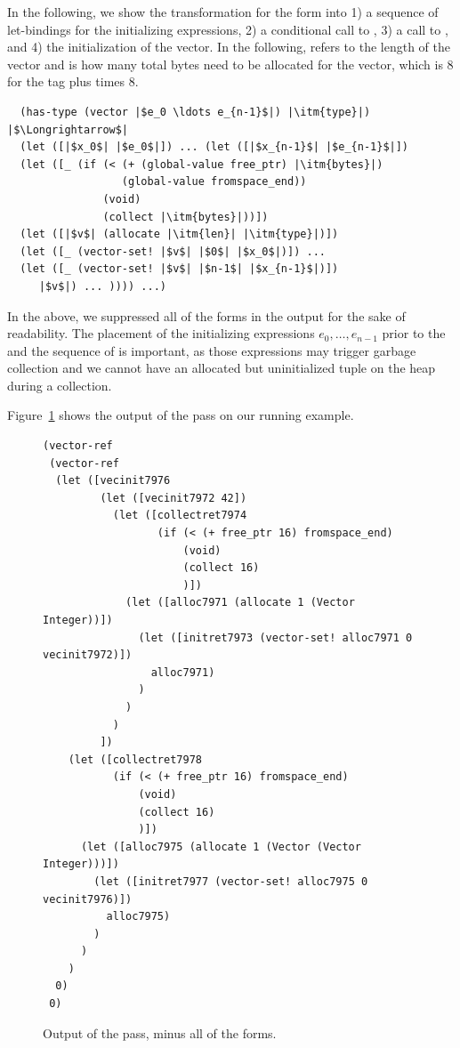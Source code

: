 \documentclass[11pt]{book}
\begin{document}
In the following, we show the transformation for the 
form into 1) a sequence of let-bindings for the initializing
expressions, 2) a conditional call to , 3) a call to
, and 4) the initialization of the vector. In the
following,  refers to the length of the vector and
 is how many total bytes need to be allocated for the
vector, which is 8 for the tag plus  times 8.
\begin{lstlisting}
  (has-type (vector |$e_0 \ldots e_{n-1}$|) |\itm{type}|)
|$\Longrightarrow$|
  (let ([|$x_0$| |$e_0$|]) ... (let ([|$x_{n-1}$| |$e_{n-1}$|])
  (let ([_ (if (< (+ (global-value free_ptr) |\itm{bytes}|)
                  (global-value fromspace_end))
               (void)
               (collect |\itm{bytes}|))])
  (let ([|$v$| (allocate |\itm{len}| |\itm{type}|)])
  (let ([_ (vector-set! |$v$| |$0$| |$x_0$|)]) ...
  (let ([_ (vector-set! |$v$| |$n-1$| |$x_{n-1}$|)])
     |$v$|) ... )))) ...)
\end{lstlisting}
In the above, we suppressed all of the  forms in the
output for the sake of readability.  The placement of the initializing
expressions $e_0,\ldots,e_{n-1}$ prior to the  and the
sequence of  is important, as those expressions may
trigger garbage collection and we cannot have an allocated but
uninitialized tuple on the heap during a collection.

Figure~\ref{fig:expose-alloc-output} shows the output of the
 pass on our running example.

\begin{figure}[tbp]
\begin{lstlisting}
(vector-ref
 (vector-ref
  (let ([vecinit7976
         (let ([vecinit7972 42])
           (let ([collectret7974
                  (if (< (+ free_ptr 16) fromspace_end)
                      (void)
                      (collect 16)
                      )])
             (let ([alloc7971 (allocate 1 (Vector Integer))])
               (let ([initret7973 (vector-set! alloc7971 0 vecinit7972)])
                 alloc7971)
               )
             )
           )
         ])
    (let ([collectret7978
           (if (< (+ free_ptr 16) fromspace_end)
               (void)
               (collect 16)
               )])
      (let ([alloc7975 (allocate 1 (Vector (Vector Integer)))])
        (let ([initret7977 (vector-set! alloc7975 0 vecinit7976)])
          alloc7975)
        )
      )
    )
  0)
 0)
\end{lstlisting}
\caption{Output of the  pass, minus
  all of the  forms.}
\label{fig:expose-alloc-output}
\end{figure}
\end{document}
